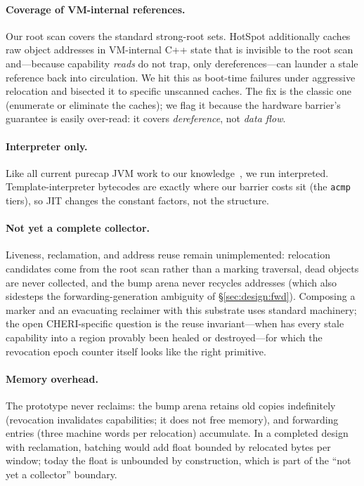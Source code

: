 \documentclass[acmsmall,nonacm,screen]{acmart}
\begin{document}
\paragraph{Coverage of VM-internal references.} Our root scan covers
the standard strong-root sets. HotSpot additionally caches raw object
addresses in VM-internal C++ state that is invisible to the root scan
and---because capability \emph{reads} do not trap, only
dereferences---can launder a stale reference back into circulation. We
hit this as boot-time failures under aggressive relocation and bisected
it to specific unscanned caches. The fix is the classic one (enumerate
or eliminate the caches); we flag it because the hardware barrier's
guarantee is easily over-read: it covers \emph{dereference}, not
\emph{data flow}.

\paragraph{Interpreter only.} Like all current purecap JVM work to our
knowledge~\cite{mojo-jvm,cheri-interpreter}, we run interpreted.
Template-interpreter bytecodes are exactly where our barrier costs sit
(the \texttt{acmp} tiers), so JIT changes the constant factors, not the
structure.

\paragraph{Not yet a complete collector.} Liveness, reclamation, and
address reuse remain unimplemented: relocation candidates come from the
root scan rather than a marking traversal, dead objects are never
collected, and the bump arena never recycles addresses (which also
sidesteps the forwarding-generation ambiguity of
\S\ref{sec:design:fwd}). Composing a marker and an evacuating
reclaimer with this substrate uses standard machinery; the open
CHERI-specific question is the reuse invariant---when has every stale
capability into a region provably been healed or destroyed---for which
the revocation epoch counter itself looks like the right primitive.

\paragraph{Memory overhead.} The prototype never reclaims: the bump
arena retains old copies indefinitely (revocation invalidates
capabilities; it does not free memory), and forwarding entries (three
machine words per relocation) accumulate. In a completed design with
reclamation, batching would add float bounded by relocated bytes per
window; today the float is unbounded by construction, which is part of
the ``not yet a collector'' boundary.
\end{document}

